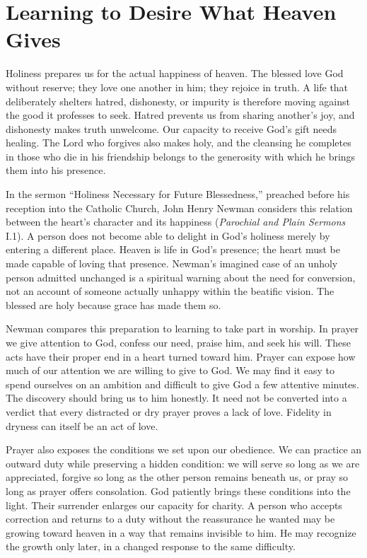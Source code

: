 \section{Learning to Desire What Heaven Gives}

Holiness prepares us for the actual happiness of heaven. The blessed love God without reserve; they love one another in him; they rejoice in truth. A life that deliberately shelters hatred, dishonesty, or impurity is therefore moving against the good it professes to seek. Hatred prevents us from sharing another's joy, and dishonesty makes truth unwelcome. Our capacity to receive God's gift needs healing. The Lord who forgives also makes holy, and the cleansing he completes in those who die in his friendship belongs to the generosity with which he brings them into his presence.

In the sermon ``Holiness Necessary for Future Blessedness,'' preached before his reception into the Catholic Church, John Henry Newman considers this relation between the heart's character and its happiness (\emph{Parochial and Plain Sermons} I.1). A person does not become able to delight in God's holiness merely by entering a different place. Heaven is life in God's presence; the heart must be made capable of loving that presence. Newman's imagined case of an unholy person admitted unchanged is a spiritual warning about the need for conversion, not an account of someone actually unhappy within the beatific vision. The blessed are holy because grace has made them so.

Newman compares this preparation to learning to take part in worship. In prayer we give attention to God, confess our need, praise him, and seek his will. These acts have their proper end in a heart turned toward him. Prayer can expose how much of our attention we are willing to give to God. We may find it easy to spend ourselves on an ambition and difficult to give God a few attentive minutes. The discovery should bring us to him honestly. It need not be converted into a verdict that every distracted or dry prayer proves a lack of love. Fidelity in dryness can itself be an act of love.

Prayer also exposes the conditions we set upon our obedience. We can practice an outward duty while preserving a hidden condition: we will serve so long as we are appreciated, forgive so long as the other person remains beneath us, or pray so long as prayer offers consolation. God patiently brings these conditions into the light. Their surrender enlarges our capacity for charity. A person who accepts correction and returns to a duty without the reassurance he wanted may be growing toward heaven in a way that remains invisible to him. He may recognize the growth only later, in a changed response to the same difficulty.

